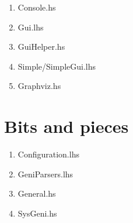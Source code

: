 \documentclass[a4paper,11pt]{report}
\begin{document}
\begin{enumerate}
\item{Console.hs}
\item{Gui.lhs}
\item{GuiHelper.hs}
\item{Simple/SimpleGui.lhs}
\item{Graphviz.hs}
\end{enumerate}

\section{Bits and pieces}

\begin{enumerate}
\item{Configuration.lhs}
\item{GeniParsers.lhs}
\item{General.hs}
\item{SysGeni.hs}
\end{enumerate}

{


}
\end{document}
